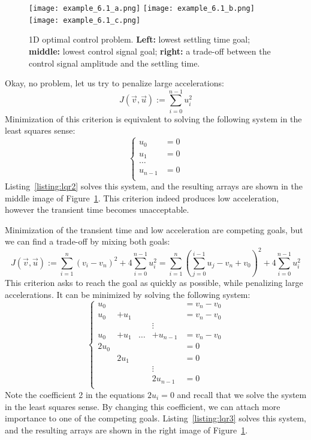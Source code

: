 \documentclass[notitlepage,oneside]{book}
\begin{document}
\begin{figure}[htb]
    \centering
    \texttt{[image: example\_6.1\_a.png]}
    \texttt{[image: example\_6.1\_b.png]}
    \texttt{[image: example\_6.1\_c.png]}
    \caption{1D optimal control problem. \textbf{Left:} lowest settling time goal; \textbf{middle:} lowest control signal goal; \textbf{right:} a trade-off between the control signal amplitude and the settling time.}
    \label{fig:lqr}
\end{figure}

Okay, no problem, let us try to penalize large accelerations:
$$
J(\vec{v}, \vec{u}) := \sum\limits_{i=0}^{n-1} u_i^2
$$
Minimization of this criterion is equivalent to solving the following system in the least squares sense:
$$
\left \{ \begin{array}{rl}
u_0     & = 0\\
u_1     & = 0\\
\dots   &    \\
u_{n-1} & = 0\\
\end{array} \right.
$$
Listing~\ref{listing:lqr2} solves this system, and the resulting arrays are shown in the middle image of Figure~\ref{fig:lqr}.
This criterion indeed produces low acceleration, however the transient time becomes unacceptable.


Minimization of the transient time and low acceleration are competing goals, but we can find a trade-off by mixing both goals:
$$
J(\vec{v},\vec{u}) := \sum\limits_{i=1}^n (v_i-v_n)^2 + 4\sum\limits_{i=0}^{n-1} u_i^2 = \sum\limits_{i=1}^n \left(\sum\limits_{j=0}^{i-1}u_j-v_n+v_0\right)^2 + 4\sum\limits_{i=0}^{n-1} u_i^2
$$
This criterion asks to reach the goal as quickly as possible, while penalizing large accelerations. It can be minimized by solving the following system:
$$
\left \{ \begin{array}{ccccl}
u_0 &       &       &           & = v_n - v_0 \\
u_0 & + u_1 &       &           & = v_n - v_0 \\
    &       &       & \vdots    &             \\
u_0 & + u_1 & \dots & + u_{n-1} & = v_n - v_0 \\
2u_0 &        &       &           & = 0 \\
     &  2u_1  &       &           & = 0 \\
     &        &       & \vdots    &     \\
     &        &       &  2u_{n-1} & = 0 \\
\end{array} \right.
$$
Note the coefficient 2 in the equations $2 u_i = 0$ and recall that we solve the system in the least squares sense.
By changing this coefficient, we can attach more importance to one of the competing goals.
Listing~\ref{listing:lqr3} solves this system, and the resulting arrays are shown in the right image of Figure~\ref{fig:lqr}.
\end{document}

